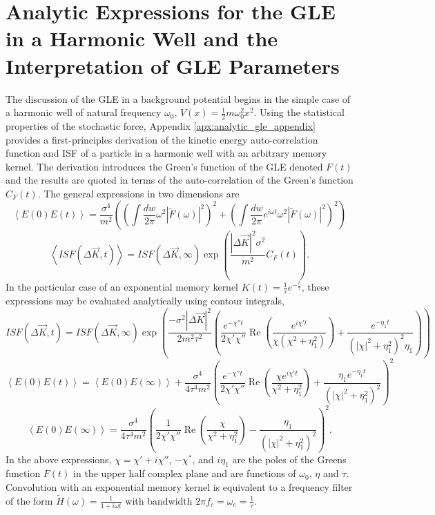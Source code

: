 \chapter{Analytic Expressions for the GLE in a Harmonic Well and the Interpretation of GLE Parameters} \label{sec:gle_interpretation}

The discussion of the GLE in a background potential begins in the simple case of a harmonic well of natural frequency $\omega_0$, $V\left(x\right) = \frac{1}{2}m\omega_0^2x^2$. Using the statistical properties of the stochastic force, Appendix \ref{apx:analytic_gle_appendix} provides a first-principles derivation of the kinetic energy auto-correlation function and ISF of a particle in a harmonic well with an arbitrary memory kernel. The derivation introduces the Green's function of the GLE denoted $F\left(t\right)$ and the results are quoted in terms of the auto-correlation of the Green's function $C_F(t)$. The general expressions in two dimensions are
\begin{equation}
\left<E(0)E(t)\right>=\frac{\sigma^4}{m^2}\left(\left(\int\frac{dw}{2\pi}\omega^2\left|\tilde{F}(\omega)\right|^2\right)^2 + \left(\int\frac{dw}{2\pi}e^{i\omega t}\omega^2\left|\tilde{F}(\omega)\right|^2\right)^2\right) \label{eq:harmonic_gle_ek}
\end{equation}
\begin{equation}
\left<ISF(\Delta \vec{K}, t)\right> = ISF\left(\Delta \vec{K}, \infty \right)\exp\left(\frac{|\Delta \vec{K}|^2 \sigma^2}{m^2} C_F\left(t\right) \right). \label{eq:harmonic_gle_isf}
\end{equation}
In the particular case of an exponential memory kernel $K(t)=\frac{1}{\tau}e^{-\frac{t}{\tau}}$, these expressions may be evaluated analytically using contour integrals,
\begin{equation}
        ISF\left(\Delta \vec{K}, t\right) = ISF\left(\Delta \vec{K}, \infty\right) \exp\left(\frac{-\sigma^2\left|\Delta \vec{K}\right|^2}{2m^2\tau^2}\left(\frac{e^{-\chi''t}}{2\chi'\chi''}\operatorname{Re}\left(\frac{e^{i\chi't}}{\chi\left(\chi^2+\eta_1^2\right)}\right) + \frac{e^{-\eta_1t}}{\left(\left|\chi\right|^2+\eta_1^2\right)^2\eta_1}\right)\right) \label{eq:exp_isf}
\end{equation}
\begin{equation}
        \left<E(0)E(t)\right>=\left<E(0)E(\infty)\right> + \frac{\sigma^4}{4\tau^4m^2}\left(\frac{e^{-\chi''t}}{2\chi'\chi''}\operatorname{Re}\left(\frac{\chi e^{i\chi't}}{\chi^2+\eta_1^2}\right) + \frac{\eta_1e^{-\eta_1 t}}{\left(\left|\chi\right|^2 + \eta_1^2\right)^2} \right)^2 \label{eq:exp_ek_auto}
\end{equation}
$$
\left<E(0)E(\infty)\right> = \frac{\sigma^4}{4\tau^4m^2}\left(\frac{1}{2\chi'\chi''}\operatorname{Re}\left(\frac{\chi}{\chi^2+\eta_1^2}\right) - \frac{\eta_1}{\left(\left|\chi\right|^2 + \eta_1^2\right)^2} \right)^2.
$$
In the above expressions, $\chi = \chi' + i\chi''$, $-\chi^*$, and $i\eta_1$ are the poles of the Greens function $F(t)$ in the upper half complex plane and are functions of $\omega_0$, $\eta$ and $\tau$. Convolution with an exponential memory kernel is equivalent to a frequency filter of the form $\tilde{H}(\omega) = \frac{1}{1+i\omega t}$ with bandwidth $2\pi f_c = \omega_c = \frac{1}{\tau}$. 

